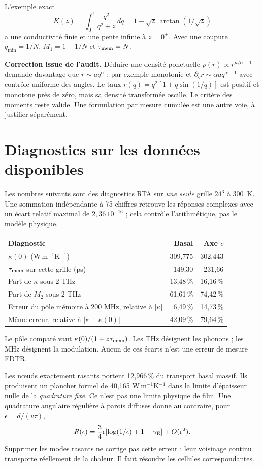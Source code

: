 \documentclass[11pt,a4paper]{article}
\begin{document}
L'exemple exact
\[
 K(z)=\int_0^1\frac{q^2}{q^2+z}\,dq
 =1-\sqrt z\,\arctan(1/\sqrt z)
\]
a une conductivité finie et une pente infinie à $z=0^+$.
Avec une coupure $q_{\min}=1/N$, $M_1=1-1/N$ et $\tau_{\rm mem}=N$.

\textbf{Correction issue de l'audit.}
Déduire une densité ponctuelle $\rho(r)\propto r^{n/\alpha-1}$ demande davantage que $r\sim aq^\alpha$ : par exemple monotonie et
$\partial_qr\sim\alpha aq^{\alpha-1}$ avec contrôle uniforme des angles.
Le taux $r(q)=q^2[1+q\sin(1/q)]$ est positif et monotone près de zéro, mais sa densité transformée oscille.
Le critère des moments reste valide. Une formulation par mesure cumulée est une autre voie, à justifier séparément.


\section{Diagnostics sur les données disponibles}
Les nombres suivants sont des diagnostics RTA sur \emph{une seule} grille $24^3$ à 300~K. Une sommation indépendante à 75 chiffres retrouve les réponses complexes avec un écart relatif maximal de $2{,}36\,10^{-16}$ ; cela contrôle l'arithmétique, pas le modèle physique.

\begin{center}\begin{tabularx}{\textwidth}{@{}Xrr@{}}\toprule
Diagnostic & Basal & Axe $c$\\\midrule
$\kappa(0)$ (W\,m$^{-1}$K$^{-1}$) & 309,775 & 302,443\\
$\tau_{\rm mem}$ sur cette grille (ps) & 149,30 & 231,66\\
Part de $\kappa$ sous 2 THz & 13,48\,\% & 16,16\,\%\\
Part de $M_2$ sous 2 THz & 61,61\,\% & 74,42\,\%\\
Erreur du pôle mémoire à 200 MHz, relative à $|\kappa|$ & 6,49\,\% & 14,73\,\%\\
Même erreur, relative à $|\kappa-\kappa(0)|$ & 42,09\,\% & 79,64\,\%\\\bottomrule
\end{tabularx}\end{center}
Le pôle comparé vaut $\kappa(0)/(1+z\tau_{\rm mem})$.
Les THz désignent les phonons ; les MHz désignent la modulation.
Aucun de ces écarts n'est une erreur de mesure FDTR.

Les nœuds exactement rasants portent 12,966\,\% du transport basal massif.
Ils produisent un plancher formel de 40,165 W\,m$^{-1}$K$^{-1}$ dans la limite d'épaisseur nulle de la \emph{quadrature fixe}. Ce n'est pas une limite physique de film.
Une quadrature angulaire régulière à parois diffuses donne au contraire, pour $\epsilon=d/(v\tau)$,
\[
 R(\epsilon)=\frac34\epsilon[\log(1/\epsilon)+1-\gamma_{\rm E}]
 +O(\epsilon^2).
\]
Supprimer les modes rasants ne corrige pas cette erreur : leur voisinage continu transporte réellement de la chaleur. Il faut résoudre les cellules correspondantes.
\end{document}
